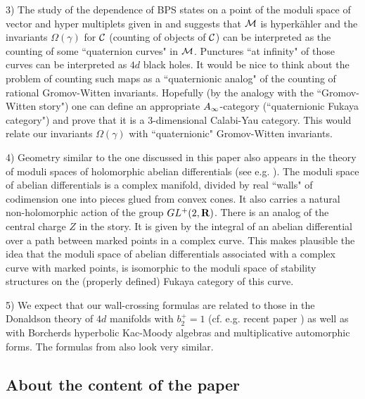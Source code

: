 \documentclass[12pt]{article}
\begin{document}
3) The study of the dependence of BPS states on a point of the moduli space
of vector and hyper multiplets given in \cite{DiM} and \cite{DM} suggests that ${\cal M}$ is hyperk\"ahler and the  invariants $\Omega(\gamma)$  for ${\cal C}$ (counting of objects of ${\mathcal C}$) can be interpreted as
the counting of some ``quaternion curves" in ${\cal M}$. Punctures ``at infinity" of those curves can be interpreted as $4d$ black holes.
It would be nice
to think about the problem of counting
such maps as  a ``quaternionic analog" of the counting of rational Gromov-Witten invariants.
Hopefully (by the analogy with the ``Gromov-Witten story")  one can define an appropriate
$A_{\infty}$-category (``quaternionic Fukaya category") and prove that it is a $3$-dimensional Calabi-Yau category.
This would relate our invariants $\Omega(\gamma)$ with ``quaternionic" Gromov-Witten invariants.




4) Geometry similar to the one discussed in this paper also appears in the theory of moduli spaces
of holomorphic abelian differentials (see e.g. \cite{Zo}). The moduli space of abelian differentials
is a complex manifold, divided by real ``walls" of codimension one into pieces glued from
convex cones. It also carries a natural non-holomorphic action of the group $GL^+(2,{\bf R})$. There is an analog of the central charge $Z$ in the story. It is given
by the integral of an abelian differential over a path between marked points in a complex curve.
This makes plausible the idea that the  moduli space of abelian differentials associated with
a complex curve with marked points, is isomorphic
to the moduli space of stability structures on the (properly defined) Fukaya category of this curve.

5) We expect that our wall-crossing formulas are related to those in the Donaldson theory of $4d$ manifolds with $b_2^+=1$ (cf. e.g. recent paper \cite{NaYo}) as well as with Borcherds hyperbolic Kac-Moody algebras and multiplicative automorphic forms. The formulas from \cite{ChVer} also look very similar.

\subsection{About the content of the paper}
\end{document}
